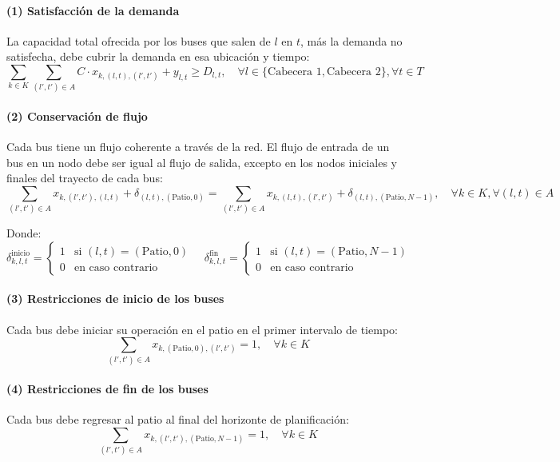 \documentclass[preprint,11pt]{elsarticle}
\begin{document}
\paragraph{(1) Satisfacción de la demanda}
La capacidad total ofrecida por los buses que salen de $l$ en $t$, más la demanda no satisfecha, debe cubrir la demanda en esa ubicación y tiempo:
\[
\sum_{k \in K} \sum_{(l',t') \in A} C \cdot x_{k,(l,t),(l',t')} + y_{l,t} \geq D_{l,t}, \quad \forall l \in \{\text{Cabecera 1}, \text{Cabecera 2}\}, \forall t \in T
\]


\paragraph{(2) Conservación de flujo}
Cada bus tiene un flujo coherente a través de la red. El flujo de entrada de un bus en un nodo debe ser igual al flujo de salida, excepto en los nodos iniciales y finales del trayecto de cada bus:
\[
\sum_{(l',t') \in A} x_{k,(l',t'),(l,t)} + \delta_{(l,t),(\text{Patio},0)} = \sum_{(l',t') \in A} x_{k,(l,t),(l',t')} + \delta_{(l,t),(\text{Patio},N-1)}, \quad \forall k \in K, \forall (l,t) \in A
\]

Donde: 
\[
\delta_{k,l,t}^{\text{inicio}} =
\begin{cases}
    1 & \text{si } (l,t) = (\text{Patio}, 0) \\
    0 & \text{en caso contrario}
\end{cases}
\quad
\delta_{k,l,t}^{\text{fin}} =
\begin{cases}
    1 & \text{si } (l,t) = (\text{Patio}, N-1) \\
    0 & \text{en caso contrario}
\end{cases}
\]


\paragraph{(3) Restricciones de inicio de los buses}
Cada bus debe iniciar su operación en el patio en el primer intervalo de tiempo:
\[
\sum_{(l',t') \in A} x_{k,(\text{Patio},0),(l',t')} = 1, \quad \forall k \in K
\]

\paragraph{(4) Restricciones de fin de los buses}
Cada bus debe regresar al patio al final del horizonte de planificación:
\[
\sum_{(l',t') \in A} x_{k,(l',t'),(\text{Patio},N-1)} = 1, \quad \forall k \in K
\]
\end{document}
